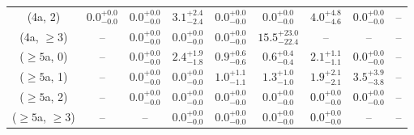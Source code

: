 \begin{table}[h!]
{\begin{tabular}{ccccccccc}
	(4a, 2) & $0.0^{+ 0.0 }_{- 0.0 }$ & $0.0^{+ 0.0 }_{- 0.0 }$ & $3.1^{+ 2.4 }_{- 2.4 }$ & $0.0^{+ 0.0 }_{- 0.0 }$ & $0.0^{+ 0.0 }_{- 0.0 }$ & $4.0^{+ 4.8 }_{- 4.6 }$ & $0.0^{+ 0.0 }_{- 0.0 }$ & -- \\[0.5ex] 
	(4a, $\ge3$) & -- & $0.0^{+ 0.0 }_{- 0.0 }$ & $0.0^{+ 0.0 }_{- 0.0 }$ & $0.0^{+ 0.0 }_{- 0.0 }$ & $15.5^{+ 23.0 }_{- 22.4 }$ & -- & -- & -- \\[0.5ex] 
	($\ge5$a, 0) & -- & $0.0^{+ 0.0 }_{- 0.0 }$ & $2.4^{+ 1.9 }_{- 1.8 }$ & $0.9^{+ 0.6 }_{- 0.6 }$ & $0.6^{+ 0.4 }_{- 0.4 }$ & $2.1^{+ 1.1 }_{- 1.1 }$ & $0.0^{+ 0.0 }_{- 0.0 }$ & -- \\[0.5ex] 
	($\ge5$a, 1) & -- & $0.0^{+ 0.0 }_{- 0.0 }$ & $0.0^{+ 0.0 }_{- 0.0 }$ & $1.0^{+ 1.1 }_{- 1.1 }$ & $1.3^{+ 1.0 }_{- 1.0 }$ & $1.9^{+ 2.1 }_{- 2.1 }$ & $3.5^{+ 3.9 }_{- 3.8 }$ & -- \\[0.5ex] 
	($\ge5$a, 2) & -- & $0.0^{+ 0.0 }_{- 0.0 }$ & $0.0^{+ 0.0 }_{- 0.0 }$ & $0.0^{+ 0.0 }_{- 0.0 }$ & $0.0^{+ 0.0 }_{- 0.0 }$ & $0.0^{+ 0.0 }_{- 0.0 }$ & $0.0^{+ 0.0 }_{- 0.0 }$ & -- \\[0.5ex] 
	($\ge5$a, $\ge3$) & -- & -- & $0.0^{+ 0.0 }_{- 0.0 }$ & $0.0^{+ 0.0 }_{- 0.0 }$ & $0.0^{+ 0.0 }_{- 0.0 }$ & $0.0^{+ 0.0 }_{- 0.0 }$ & -- & -- \\[0.5ex] 
	\hline
	\hline
\end{tabular}}
\end{table}

